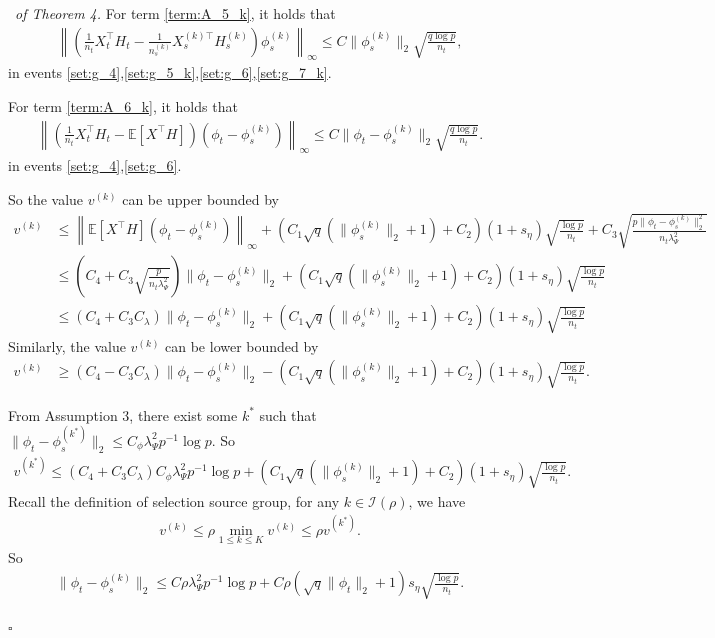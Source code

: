 \documentclass[12pt]{article}
\newenvironment{pf}{{\noindent \it Proof}\ }{\hfill $\square$\par}
\begin{document}
\begin{pf}{\it of Theorem 4. }
    For term \ref{term:A_5_k}, it holds that
    \begin{align*}
        \left\|\left(\frac{1}{n_t}X_t^\top H_t - \frac{1}{n_s^{(k)}} X_s^{(k)\top}H_s^{(k)}\right)\phi_s^{(k)}\right\|_{\infty}  \le C\|\phi_s^{(k)}\|_2\sqrt{\frac{q\log p}{n_t}},
    \end{align*}
    in events \ref{set:g_4},\ref{set:g_5_k},\ref{set:g_6},\ref{set:g_7_k}. 

    For term \ref{term:A_6_k}, it holds that 
    \begin{align*}
        \left\|\left(\frac{1}{n_t}X_t^\top H_t - \mathbb{E}[X^\top H]\right)\left(\phi_t -\phi_s^{(k)}\right)\right\|_{\infty} \le C\|\phi_t-\phi_s^{(k)}\|_2\sqrt{\frac{q\log p}{n_t}}. 
    \end{align*}
    in events \ref{set:g_4},\ref{set:g_6}.

    So the value $v^{(k)}$ can be upper bounded by 
    \begin{align*}
        v^{(k)}&  \le \left\|\mathbb{E}[X^\top H] (\phi_t - \phi_s^{(k)})\right\|_{\infty} + (C_1\sqrt{q}(\|\phi_s^{(k)}\|_2+1) + C_2)(1+s_\eta)\sqrt{\frac{\log p}{n_t}} + C_3 \sqrt{\frac{p\|\phi_t-\phi_s^{(k)}\|^2_2}{n_t \lambda_\Psi^2}}\\& \le 
        \left(C_4+C_3\sqrt{\frac{p}{n_t\lambda_\Psi^2}}\right) \|\phi_t - \phi_s^{(k)}\|_2 + (C_1\sqrt{q}(\|\phi_s^{(k)}\|_2+1) + C_2)(1+s_\eta)\sqrt{\frac{\log p}{n_t}} \\& \le
        (C_4 + C_3C_\lambda)\|\phi_t - \phi_s^{(k)}\|_2 + (C_1\sqrt{q}(\|\phi_s^{(k)}\|_2+1) + C_2)(1+s_\eta)\sqrt{\frac{\log p}{n_t}}
    \end{align*}
    Similarly, the value $v^{(k)}$ can be lower bounded by 
    \begin{align*}
        v^{(k)} & \ge(C_4 - C_3C_\lambda)\|\phi_t - \phi_s^{(k)}\|_2 - (C_1\sqrt{q}(\|\phi_s^{(k)}\|_2+1) + C_2)(1+s_\eta)\sqrt{\frac{\log p}{n_t}}. 
    \end{align*}

    From Assumption 3, there exist some $k^*$ such that 
    $\|\phi_t - \phi_s^{(k^*)}\|_2 \le C_\phi \lambda_\Psi^2 p^{-1}\log p$. So
    \begin{align*}
        v^{(k^*)} \le (C_4 + C_3C_\lambda)C_\phi \lambda_\Psi^2 p^{-1}\log p + (C_1\sqrt{q}(\|\phi_s^{(k)}\|_2+1) + C_2)(1+s_\eta)\sqrt{\frac{\log p}{n_t}}.
    \end{align*}
    Recall the definition of selection source group, for any $k\in \mathcal{I}(\rho)$, we have 
    \begin{align*}
        v^{(k)} \le \rho \min_{1\le k\le K} v^{(k)} \le \rho v^{(k^*)}. 
    \end{align*}
    So 
    \begin{align}
    \label{eq:information_phi}
         \|\phi_t - \phi_s^{(k)}\|_2 \le C\rho \lambda_\Psi^2p^{-1}\log p + C\rho (\sqrt{q}\|\phi_t\|_2 + 1)s_\eta\sqrt{\frac{\log p}{n_t}}. 
    \end{align}


\end{pf}
\end{document}
